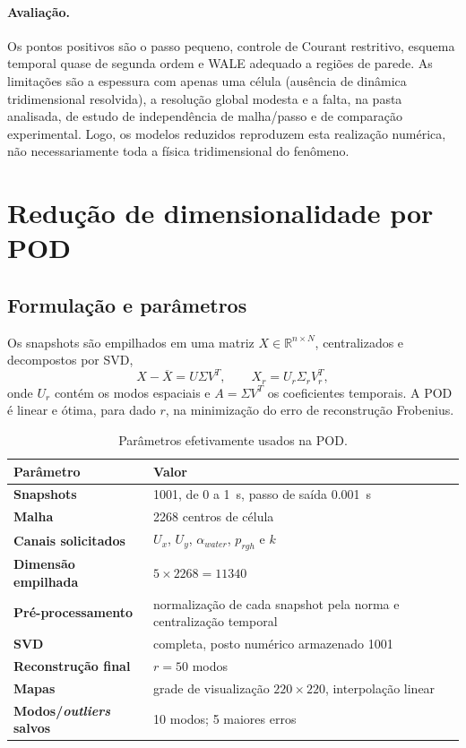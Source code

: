 \documentclass[12pt,a4paper]{article}
\begin{document}
\paragraph{Avaliação.} Os pontos positivos são o passo pequeno, controle de Courant restritivo, esquema temporal quase de segunda ordem e WALE adequado a regiões de parede. As limitações são a espessura com apenas uma célula (ausência de dinâmica tridimensional resolvida), a resolução global modesta e a falta, na pasta analisada, de estudo de independência de malha/passo e de comparação experimental. Logo, os modelos reduzidos reproduzem esta realização numérica, não necessariamente toda a física tridimensional do fenômeno.

\section{Redução de dimensionalidade por POD}

\subsection{Formulação e parâmetros}
Os snapshots são empilhados em uma matriz $X\in\mathbb{R}^{n\times N}$, centralizados e decompostos por SVD,
\begin{equation}
 X-\overline X=U\Sigma V^T,\qquad
 X_r=U_r\Sigma_rV_r^T,
\end{equation}
onde $U_r$ contém os modos espaciais e $A=\Sigma V^T$ os coeficientes temporais. A POD é linear e ótima, para dado $r$, na minimização do erro de reconstrução Frobenius.

\begin{table}[H]
\centering
\caption{Parâmetros efetivamente usados na POD.}
\label{tab:podparam}
\begin{tabularx}{\textwidth}{>{\bfseries}l X}
\toprule
Parâmetro & Valor\\
\midrule
Snapshots & 1001, de 0 a \SI{1}{s}, passo de saída \SI{0.001}{s}\\
Malha & 2268 centros de célula\\
Canais solicitados & $U_x$, $U_y$, $\alpha_{water}$, $p_{rgh}$ e $k$\\
Dimensão empilhada & $5\times2268=11340$\\
Pré-processamento & normalização de cada snapshot pela norma e centralização temporal\\
SVD & completa, posto numérico armazenado 1001\\
Reconstrução final & $r=50$ modos\\
Mapas & grade de visualização $220\times220$, interpolação linear\\
Modos/\emph{outliers} salvos & 10 modos; 5 maiores erros\\
\bottomrule
\end{tabularx}
\end{table}
\end{document}
